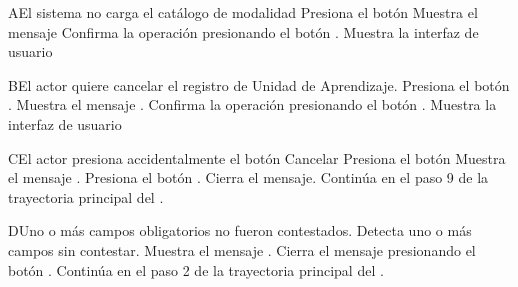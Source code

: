 
\begin{UCtrayectoriaA}{A}{El sistema no carga el catálogo de modalidad}
	\UCpaso[\UCactor] Presiona el botón 
	\UCpaso Muestra el mensaje 
	\UCpaso[\UCactor] Confirma la operación presionando el botón .
	 \UCpaso Muestra la interfaz de usuario 

\end{UCtrayectoriaA}



\begin{UCtrayectoriaA}{B}{El actor quiere cancelar el registro de Unidad de Aprendizaje.}
	\UCpaso[\UCactor] Presiona el botón .
	\UCpaso Muestra el mensaje .
	\UCpaso[\UCactor] Confirma la operación presionando el botón .
	\UCpaso Muestra la interfaz de usuario 
\end{UCtrayectoriaA}




\begin{UCtrayectoriaA}{C}{El actor presiona accidentalmente el botón Cancelar}
	\UCpaso[\UCactor] Presiona el botón 
	\UCpaso Muestra el mensaje .
	\UCpaso[\UCactor] Presiona el botón .
	\UCpaso Cierra el mensaje.
	\UCpaso Continúa en el paso 9 de la trayectoria principal del .
\end{UCtrayectoriaA}




\begin{UCtrayectoriaA}{D}{Uno o más campos obligatorios no fueron contestados.}
	\UCpaso Detecta uno o más campos sin contestar.
	\UCpaso Muestra el mensaje .
	\UCpaso[\UCactor] Cierra el mensaje presionando el botón .
	\UCpaso Continúa en el paso 2 de la trayectoria principal del .
\end{UCtrayectoriaA}